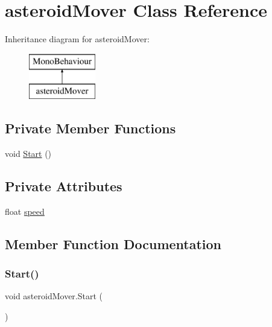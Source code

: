 \hypertarget{classasteroid_mover}{}\section{asteroid\+Mover Class Reference}
\label{classasteroid_mover}
Inheritance diagram for asteroid\+Mover\+:\begin{figure}[H]
\begin{center}
\leavevmode
\includegraphics[height=2.000000cm]{classasteroid_mover}
\end{center}
\end{figure}
\subsection*{Private Member Functions}
\begin{DoxyCompactItemize}
\item 
void \mbox{\hyperlink{classasteroid_mover_a80e19d16f013e609127dfbdc53dbf817}{Start}} ()
\end{DoxyCompactItemize}
\subsection*{Private Attributes}
\begin{DoxyCompactItemize}
\item 
float \mbox{\hyperlink{classasteroid_mover_a1e23da1a73200fd4f129e5de86bdf32c}{speed}}
\end{DoxyCompactItemize}


\subsection{Member Function Documentation}
\mbox{\label{classasteroid_mover_a80e19d16f013e609127dfbdc53dbf817}} 
\subsubsection{\texorpdfstring{Start()}{Start()}}
{\footnotesize\ttfamily void asteroid\+Mover.\+Start (\begin{DoxyParamCaption}{ }\end{DoxyParamCaption})\hspace{0.3cm}{\ttfamily [private]}}



